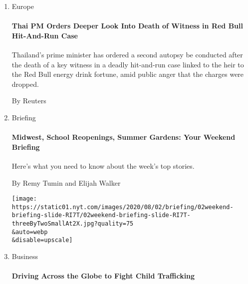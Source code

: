 \begin{enumerate}
\def\labelenumi{\arabic{enumi}.}
\item
  Europe

  \href{/reuters/2020/08/02/world/europe/02reuters-thailand-redbull.html?searchResultPosition=1}{}

  \hypertarget{thai-pm-orders-deeper-look-into-death-of-witness-in-red-bull-hit-and-run-case}{%
  \paragraph{Thai PM Orders Deeper Look Into Death of Witness in Red
  Bull Hit-And-Run
  Case}\label{thai-pm-orders-deeper-look-into-death-of-witness-in-red-bull-hit-and-run-case}}

  Thailand's prime minister has ordered a second autopsy be conducted
  after the death of a key witness in a deadly hit-and-run case linked
  to the heir to the Red Bull energy drink fortune, amid public anger
  that the charges were dropped.

  By Reuters
\item
  Briefing

  \href{/2020/08/02/briefing/midwest-school-reopenings-summer-gardens.html?searchResultPosition=2}{}

  \hypertarget{midwest-school-reopenings-summer-gardens-your-weekend-briefing}{%
  \paragraph{Midwest, School Reopenings, Summer Gardens: Your Weekend
  Briefing}\label{midwest-school-reopenings-summer-gardens-your-weekend-briefing}}

  Here's what you need to know about the week's top stories.

  By Remy Tumin and Elijah Walker

  \texttt{[image: https://static01.nyt.com/images/2020/08/02/briefing/02weekend-briefing-slide-RI7T/02weekend-briefing-slide-RI7T-threeByTwoSmallAt2X.jpg?quality=75\\\&auto=webp\\\&disable=upscale]}
\item
  Business

  \href{/2020/08/02/business/brinkerhoff-racing-child-trafficking.html?searchResultPosition=3}{}

  \hypertarget{driving-across-the-globe-to-fight-child-trafficking}{%
  \paragraph{Driving Across the Globe to Fight Child
  Trafficking}\label{driving-across-the-globe-to-fight-child-trafficking}}


\end{enumerate}
